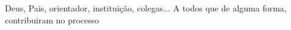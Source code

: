 
\begin{agradecimentos}

Deus, Pais, orientador, instituição, colegas... A todos que de alguma forma, contribuiram no processo

\end{agradecimentos}
